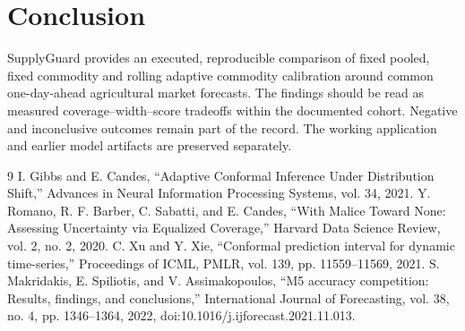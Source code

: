 \documentclass[conference]{IEEEtran}
\begin{document}
\section{Conclusion}
SupplyGuard provides an executed, reproducible comparison of fixed pooled, fixed commodity and rolling adaptive commodity calibration around common one-day-ahead agricultural market forecasts. The findings should be read as measured coverage--width--score tradeoffs within the documented cohort. Negative and inconclusive outcomes remain part of the record. The working application and earlier model artifacts are preserved separately.
\begin{thebibliography}{9}
 I. Gibbs and E. Candes, ``Adaptive Conformal Inference Under Distribution Shift,'' Advances in Neural Information Processing Systems, vol. 34, 2021.
 Y. Romano, R. F. Barber, C. Sabatti, and E. Candes, ``With Malice Toward None: Assessing Uncertainty via Equalized Coverage,'' Harvard Data Science Review, vol. 2, no. 2, 2020.
 C. Xu and Y. Xie, ``Conformal prediction interval for dynamic time-series,'' Proceedings of ICML, PMLR, vol. 139, pp. 11559--11569, 2021.
 S. Makridakis, E. Spiliotis, and V. Assimakopoulos, ``M5 accuracy competition: Results, findings, and conclusions,'' International Journal of Forecasting, vol. 38, no. 4, pp. 1346--1364, 2022, doi:10.1016/j.ijforecast.2021.11.013.
\end{thebibliography}
\end{document}
